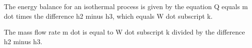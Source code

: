 The energy balance for an isothermal process is given by the equation Q equals m dot times the difference h2 minus h3, which equals W dot subscript k.

The mass flow rate m dot is equal to W dot subscript k divided by the difference h2 minus h3.